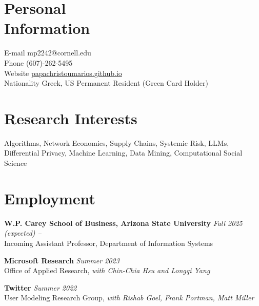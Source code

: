 \documentclass[margin]{res}
\newcommand{\field}[2]{\noindent \textbf{#1} \hfill #2 \\}
\newcommand{\specialurl}[2]{\href {#2} {{{[#1]}}}}
\begin{document}

\begin{resume}

\section{Personal \\ Information} 
E-mail \hfill mp2242@cornell.edu \\
Phone \hfill (607)-262-5495 \\
Website \hfill \href{https://papachristoumarios.github.io}{{papachristoumarios.github.io}} \\
Nationality \hfill Greek, US Permanent Resident (Green Card Holder)
  

\section{Research Interests} Algorithms, Network Economics, Supply Chains, Systemic Risk, LLMs, Differential Privacy, Machine Learning, Data Mining, Computational Social Science


\section{Employment}

\field{W.P. Carey School of Business, Arizona State University}{\emph{Fall 2025 (expected) --}}{Incoming Assistant Professor, Department of Information Systems} 

\field{Microsoft Research}{\emph{Summer 2023}}{Office of Applied Research, \emph{with Chin-Chia Hsu and Longqi Yang}}

\field{Twitter}{\emph{Summer 2022}}{User Modeling Research Group, \emph{with Rishab Goel, Frank Portman, Matt Miller}}



\end{resume}
\end{document}
